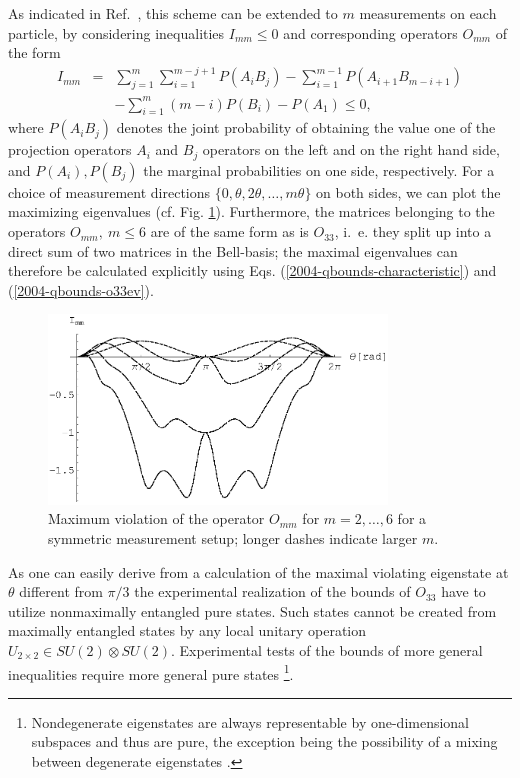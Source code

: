 \documentclass[prl,showpacs,showkeys,amsfonts,amsmath,twocolumn]{revtex4}
\begin{document}
As indicated in Ref.~\cite{collins-gisin-2003}, this scheme can be extended to $m$
measurements on each particle, by considering inequalities $I_{mm}
\leq 0$ and
corresponding operators $O_{mm}$ of the form
\begin{eqnarray}
  I_{mm}&=& \sum_{j=1}^{m}\sum_{i=1}^{m-j+1}P({A_i B_j})-\sum_{i=1}^{m-1}
  P({A_{i+1}B_{m-i+1}}) \nonumber\\
  &&-\sum_{i=1}^{m}(m-i)P(B_{i}) - P(A_1) \leq 0,
\end{eqnarray}
where $P(A_i B_j)$ denotes the joint probability of obtaining the value one of the
projection operators $A_i$ and $B_j$ operators on the left and on the
right hand side, and $P(A_i), P(B_j)$ the marginal probabilities on
one side, respectively.
For a choice of measurement directions
$\{0,\theta,2\theta,\ldots,m\theta\}$ on both sides, we can plot the
maximizing eigenvalues
(cf. Fig. \ref{fig:2004-qbounds-f2}). Furthermore, the matrices belonging to the operators $O_{mm},\ m \leq
6$
are of the same form
as is $O_{33}$, i.~e. they
split up into a direct sum of two matrices in the
Bell-basis; the maximal eigenvalues can therefore be  calculated
explicitly using Eqs. (\ref{2004-qbounds-characteristic}) and (\ref{2004-qbounds-o33ev}).
\begin{figure}[htbp]
  \centering
  \includegraphics[width=90mm]{2004-qbounds-f2}
  \caption{Maximum violation of the operator $O_{mm}$ for
    $m=2,\ldots,6$ for a symmetric measurement setup; longer dashes indicate larger $m$.}
  \label{fig:2004-qbounds-f2}
\end{figure}





As one can easily derive from a calculation of the maximal violating
eigenstate at $\theta$ different from $\pi/3$ the
experimental realization of the bounds of $O_{33}$ have to utilize
nonmaximally entangled pure states.
Such states cannot be
created from maximally entangled states
by any local unitary
operation $U_{2\times 2} \in SU(2) \otimes SU(2)$.
Experimental tests of the bounds of more general inequalities require
more general pure states
\footnote{
Nondegenerate eigenstates are always representable by one-dimensional subspaces
and thus are pure, the exception being the possibility of a mixing between
degenerate eigenstates \cite{braunstein92}.}.
\end{document}
